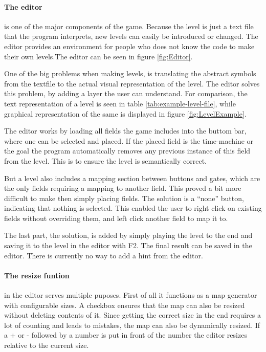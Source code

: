 \paragraph{The editor}
is one of the major components of the game. Because the level is just
a text file that the program interprets, new levels can easily be
introduced or changed. The editor provides an environment for people
who does not know the code to make their own levels.The editor can
be seen in figure \ref{fig:Editor}.

One of the big problems when making levels, is translating the abstract
symbols from the textfile to the actual visual representation of the level.
The editor solves this problem, by adding a layer the user can understand.
For comparison, the text representation of a level is seen in table
\ref{tab:example-level-file}, while graphical representation of the same
is displayed in figure \ref{fig:LevelExample}. 


The editor works by loading all fields the game includes into the
buttom bar, where one can be selected and placed. If the placed field
is the time-machine or the goal the program automatically removes any
previous instance of this field from the level.  This is to ensure the
level is semantically correct.

But a level also includes a mapping section between buttons and gates,
which are the only fields requiring a mapping to another field. This
proved a bit more difficult to make then simply placing fields. The
solution is a ``none'' button, indicating that nothing is
selected. This enabled the user to right click on existing fields
without overriding them, and left click another field to map it to.

The last part, the solution, is added by simply playing the level to the end
and saving it to the level in the editor with F2. The final result can be saved
in the editor. There is currently no way to add a hint from the editor.

\paragraph{The resize funtion} in the editor serves multiple puposes. First
of all it functions as a map generator with configurable sizes. A checkbox
ensures that the map can also be resized without deleting contents of it.
Since getting the correct size in the end requires a lot of counting and leads
to mistakes, the map can also be dynamically resized. If a + or - followed
by a number is put in front of the number the editor resizes relative to the
current size.

